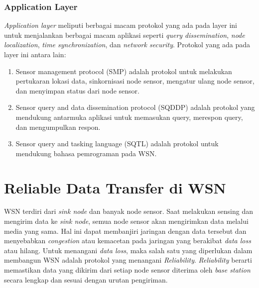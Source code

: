 \subsubsection{Application Layer}
\textit{Application layer} meliputi berbagai macam protokol yang ada pada layer ini untuk menjalankan berbagai macam aplikasi seperti \textit{query dissemination}, \textit{node localization}, \textit{time synchronization}, dan \textit{network security}. Protokol yang ada pada layer ini antara lain:
\begin{enumerate}
	\item Sensor management protocol (SMP) adalah protokol untuk melakukan pertukaran lokasi data, sinkornisasi node sensor, mengatur ulang node sensor, dan menyimpan status dari node sensor.
	\item Sensor query and data dissemination protocol (SQDDP) adalah protokol yang mendukung antarmuka aplikasi untuk memasukan query, merespon query, dan mengumpulkan respon.
	\item Sensor query and tasking language (SQTL) adalah protokol untuk mendukung bahasa pemrograman pada WSN.
\end{enumerate}


\section{Reliable Data Transfer di WSN}
WSN terdiri dari \textit{sink node} dan banyak node sensor. Saat melakukan sensing dan mengirim data ke \textit{sink node}, semua node sensor akan mengirimkan data melalui media yang sama. Hal ini dapat membanjiri jaringan dengan data tersebut dan menyebabkan \textit{congestion} atau kemacetan pada jaringan yang berakibat \textit{data loss} atau hilang. Untuk menangani \textit{data loss}, maka salah satu yang diperlukan dalam membangun WSN adalah protokol yang menangani \textit{Reliability}. \textit{Reliability} berarti memastikan data yang dikirim dari setiap node sensor diterima oleh \textit{base station} secara lengkap dan sesuai dengan urutan pengiriman.

